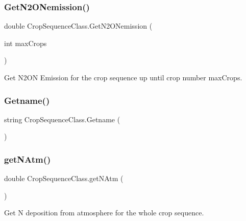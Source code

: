 \subsubsection{\texorpdfstring{GetN2ONemission()}{GetN2ONemission()}\hspace{0.1cm}{\footnotesize\ttfamily [2/2]}}
{\footnotesize\ttfamily double Crop\+Sequence\+Class.\+Get\+N2\+O\+Nemission (\begin{DoxyParamCaption}\item[{int}]{max\+Crops }\end{DoxyParamCaption})\hspace{0.3cm}{\ttfamily [inline]}}



Get N2\+ON Emission for the crop sequence up until crop number max\+Crops. 

\mbox{\label{class_crop_sequence_class_a30d688c391ca01b201e2bc79fa76335b}} 
\subsubsection{\texorpdfstring{Getname()}{Getname()}}
{\footnotesize\ttfamily string Crop\+Sequence\+Class.\+Getname (\begin{DoxyParamCaption}{ }\end{DoxyParamCaption})\hspace{0.3cm}{\ttfamily [inline]}}

\mbox{\label{class_crop_sequence_class_ae39925ea474556830b1d10d17ba8637a}} 
\subsubsection{\texorpdfstring{getNAtm()}{getNAtm()}\hspace{0.1cm}{\footnotesize\ttfamily [1/2]}}
{\footnotesize\ttfamily double Crop\+Sequence\+Class.\+get\+N\+Atm (\begin{DoxyParamCaption}{ }\end{DoxyParamCaption})\hspace{0.3cm}{\ttfamily [inline]}}



Get N deposition from atmosphere for the whole crop sequence. 

